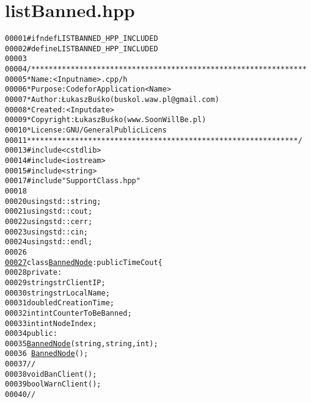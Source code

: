 \hypertarget{listBanned_8hpp_source}{
\section{listBanned.hpp}
}


\begin{footnotesize}\begin{alltt}
00001 \textcolor{preprocessor}{#ifndef LISTBANNED\_HPP\_INCLUDED}
00002 \textcolor{preprocessor}{}\textcolor{preprocessor}{#define LISTBANNED\_HPP\_INCLUDED}
00003 \textcolor{preprocessor}{}
00004 \textcolor{comment}{/***************************************************************}
00005 \textcolor{comment}{ * Name:      <Input name>.cpp/h}
00006 \textcolor{comment}{ * Purpose:   Code for Application <Name>}
00007 \textcolor{comment}{ * Author:    Łukasz Buśko (buskol.waw.pl@gmail.com)}
00008 \textcolor{comment}{ * Created:   <Input date>}
00009 \textcolor{comment}{ * Copyright: Łukasz Buśko (www.SoonWillBe.pl)}
00010 \textcolor{comment}{ * License:   GNU / General Public Licens}
00011 \textcolor{comment}{ **************************************************************/}
00013 \textcolor{preprocessor}{#include <cstdlib>}
00014 \textcolor{preprocessor}{#include <iostream>}
00015 \textcolor{preprocessor}{#include <string>}
00017 \textcolor{preprocessor}{#include "SupportClass.hpp"}
00018 
00020 \textcolor{keyword}{using} std::string;
00021 \textcolor{keyword}{using} std::cout;
00022 \textcolor{keyword}{using} std::cerr;
00023 \textcolor{keyword}{using} std::cin;
00024 \textcolor{keyword}{using} std::endl;
00026 
\hypertarget{listBanned_8hpp_source_l00027}{}\hyperlink{classBannedNode}{00027} \textcolor{keyword}{class }\hyperlink{classBannedNode}{BannedNode}: \textcolor{keyword}{public} TimeCout\{
00028     \textcolor{keyword}{private}:
00029         \textcolor{keywordtype}{string} strClientIP;
00030         \textcolor{keywordtype}{string} strLocalName;
00031         \textcolor{keywordtype}{double} dCreationTime;
00032         \textcolor{keywordtype}{int} intCounterToBeBanned;
00033         \textcolor{keywordtype}{int} intNodeIndex;
00034     \textcolor{keyword}{public}:
00035         \hyperlink{classBannedNode_a7554d4749594dc5b3dc26dbc32c7aba4}{BannedNode}(\textcolor{keywordtype}{string},\textcolor{keywordtype}{string},\textcolor{keywordtype}{int});
00036         ~\hyperlink{classBannedNode}{BannedNode}();
00037         \textcolor{comment}{//}
00038         \textcolor{keywordtype}{void} BanClient();
00039         \textcolor{keywordtype}{bool} WarnClient();
00040         \textcolor{comment}{//}

\end{alltt}
\end{footnotesize}
